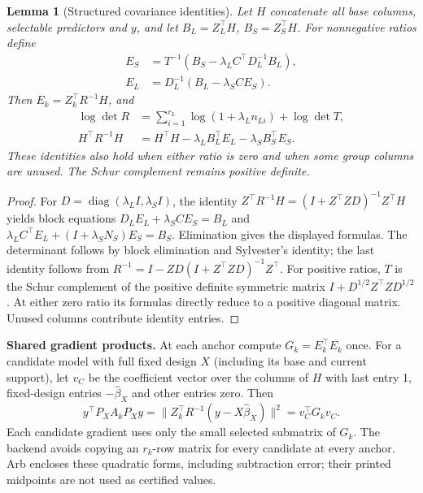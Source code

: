 \documentclass[11pt,a4paper]{article}
\newtheorem{lemma}[theorem]{Lemma}
\theoremstyle{remark}\newtheorem{remark}[theorem]{Remark}
\newcommand{\diag}{\operatorname{diag}}
\begin{document}
\begin{lemma}[Structured covariance identities]\label{lem:schur}
Let $H$ concatenate all base columns, selectable predictors and $y$, and let
$B_L=Z_L^\top H$, $B_S=Z_S^\top H$. For nonnegative ratios define
\begin{align}
E_S&=T^{-1}(B_S-\lambda_LC^\top D_L^{-1}B_L),\\
E_L&=D_L^{-1}(B_L-\lambda_SC E_S).
\end{align}
Then $E_k=Z_k^\top R^{-1}H$, and
\begin{align}
\log\det R&=\sum_{i=1}^{r_L}\log(1+\lambda_L n_{Li})+\log\det T,\label{eq:schurdet}\\
H^\top R^{-1}H&=H^\top H-\lambda_L B_L^\top E_L-\lambda_S B_S^\top E_S.
\end{align}
These identities also hold when either ratio is zero and when some group columns
are unused. The Schur complement remains positive definite.
\end{lemma}
\begin{proof}
For $D=\diag(\lambda_LI,\lambda_SI)$, the identity
$Z^\top R^{-1}H=(I+Z^\top ZD)^{-1}Z^\top H$ yields block equations
$D_LE_L+\lambda_SC E_S=B_L$ and
$\lambda_LC^\top E_L+(I+\lambda_SN_S)E_S=B_S$.
Elimination gives the displayed formulas. The determinant follows by block
elimination and Sylvester's identity; the last identity follows from
$R^{-1}=I-ZD(I+Z^\top ZD)^{-1}Z^\top$. For positive ratios, $T$ is the Schur
complement of the positive definite symmetric matrix
$I+D^{1/2}Z^\top ZD^{1/2}$. At either zero ratio its formulas directly reduce
to a positive diagonal matrix. Unused columns contribute identity entries.
\end{proof}

\textbf{Shared gradient products.}
At each anchor compute $G_k=E_k^\top E_k$ once. For a candidate model with full
fixed design $X$ (including its base and current support), let
$v_C$ be the coefficient vector over the columns of $H$ with last entry 1,
fixed-design entries $-\widehat\beta_X$ and other entries zero. Then
\begin{equation}\label{eq:sharedgradient}
y^\top P_X A_k P_X y=\|Z_k^\top R^{-1}(y-X\widehat\beta_X)\|^2
                      =v_C^\top G_k v_C.
\end{equation}
Each candidate gradient uses only the small selected submatrix of $G_k$.
The backend avoids copying an $r_k$-row matrix for every candidate at every
anchor. Arb encloses these quadratic forms, including subtraction error; their
printed midpoints are not used as certified values.
\end{document}
